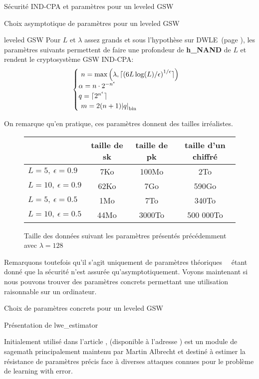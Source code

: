\begin{section}{Sécurité IND-CPA et paramètres pour un leveled GSW}
\begin{subsection}{Choix asymptotique de paramètres pour un leveled GSW}
\begin{thm}{leveled GSW}
	Pour $L$ et $\lambda$ assez grands et sous l'hypothèse sur DWLE~(page \pageref{hyp_dlwe}), les paramètres suivants permettent de faire une profondeur de \textbf{h\_NAND} de $L$
et rendent le cryptosystème GSW IND-CPA:
\[ \begin{cases} 
	n = \max\left(\lambda, \lceil {\left(6 L \log(L)
	/\epsilon\right)}^{1/\epsilon}\rceil\right)  \\
	\alpha  = n \cdot 2^{-n^\epsilon}  \\
	q = \lceil 2^{n^\epsilon} \rceil\\ 
	m = 2(n+1)\bnorm{q} \\  
	\end{cases}  \]
\end{thm}

On remarque qu'en pratique, ces paramètres donnent des tailles irréalistes.
\begin{figure}[!ht]
\begin{tabular}{|l|c|c|c|}
\hline
& taille de sk& taille de pk& taille d'un chiffré \\
\hline
$L = 5, \ \epsilon = 0.9$ & 7Ko & 100Mo & 2To \\
\hline
$L = 10, \ \epsilon = 0.9$ & 62Ko & 7Go & 590Go \\
\hline
$L = 5, \ \epsilon = 0.5$ & 1Mo & 7To & 340To \\
\hline
$L = 10, \ \epsilon = 0.5$ & 44Mo & 3000To & 500 000To \\
\hline
\end{tabular}
\caption{Taille des données suivant les paramètres présentés précédemment avec $\lambda = 128$}
\label{size_boostrapping}
\end{figure}

Remarquons toutefois qu'il s'agit uniquement de paramètres \og théoriques \fg~\ étant donné que la sécurité n'est
assurée qu'asymptotiquement. Voyons maintenant si nous pouvons trouver des paramètres concrets permettant une utilisation 
raisonnable sur un ordinateur.

\end{subsection}

\begin{subsection}{Choix de paramètres concrets pour un leveled GSW}
\begin{subsubsection}{Présentation de lwe\_estimator}
\label{estimator}
	
Initialement utilisé dans l'article \cite{EPRINT:AlbPlaSco15},  (disponible à l'adresse
\cite{estimator}) est un module de sagemath principalement maintenu par Martin Albrecht et destiné à estimer la résistance
de paramètres précis face à diverses attaques connues pour le problème de learning with error.


\end{subsubsection}
\end{subsection}
\end{section}
